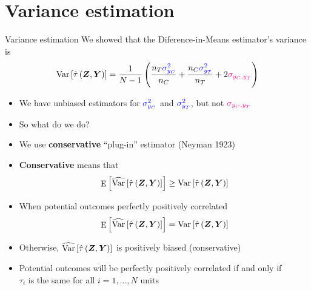 \documentclass[table, xcolor = {dvipsnames}, 9pt]{beamer}
\theoremstyle{plain}
\newcommand{\bh}[1]{{\color{blue}{#1}}}
\newcommand{\mh}[1]{{\color{magenta}{#1}}}
\DeclareMathOperator{\E}{\rm{E}}
\DeclareMathOperator{\Var}{\rm{Var}}
\begin{document}
\section{Variance estimation}
\begin{frame}{Variance estimation} 
We showed that the Diference-in-Means estimator's variance is \vspace{1em}
\begin{equation*}
\Var\left[\hat{\tau}\left(\bm{Z}, \bm{Y}\right)\right] = \frac{1}{N - 1}\left(\frac{n_T \bh{\sigma^2_{y_C}}}{n_C} + \frac{n_C \bh{\sigma^2_{y_T}}}{n_T} + 2\mh{\sigma_{y_C, y_T}}\right)
\end{equation*}
\begin{itemize}
\item We have unbiased estimators for $\bh{\sigma^2_{y_C}}$ and $\bh{\sigma^2_{y_T}}$, but not $\mh{\sigma_{y_C, y_T}}$
\item So what do we do? \pause
\item We use \textbf{conservative} ``plug-in'' estimator (Neyman 1923)
\item \textbf{Conservative} means that
\begin{equation*}
\E\left[\widehat{\Var}\left[\hat{\tau}\left(\bm{Z}, \bm{Y}\right)\right]\right] \geq \Var\left[\hat{\tau}\left(\bm{Z}, \bm{Y}\right)\right]
\end{equation*} \pause
\item When potential outcomes perfectly positively correlated
\begin{equation*}
\E\left[\widehat{\Var}\left[\hat{\tau}\left(\bm{Z}, \bm{Y}\right)\right]\right] = \Var\left[\hat{\tau}\left(\bm{Z}, \bm{Y}\right)\right]
\end{equation*}
\item Otherwise, $\widehat{\Var}\left[\hat{\tau}\left(\bm{Z}, \bm{Y}\right)\right]$ is positively biased (conservative) \pause
\item Potential outcomes will be perfectly positively correlated if and only if \\ $\tau_i$ is the same for all $i = 1, \ldots , N$ units
\end{itemize}
\end{frame}
\end{document}
